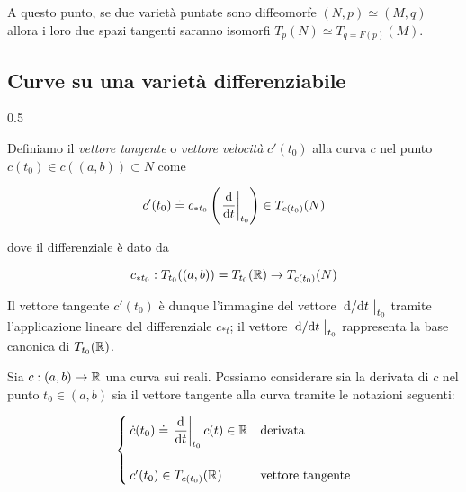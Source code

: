 A questo punto, se due varietà puntate sono diffeomorfe $ (N,p) \simeq (M,q) $ allora i loro due spazi tangenti saranno isomorfi $ T_{p}(N) \simeq T_{q=F(p)}(M) $.

\subsection{Curve su una varietà differenziabile}

	{0.5}{%
			}

Definiamo il \textit{vettore tangente} o \textit{vettore velocità} $ c'(t_{0}) $ alla curva $ c $ nel punto $ c(t_{0}) \in c((a,b)) \subset N $ come

\begin{equation}
	c'(t_{0}) \doteq c_{*t_{0}} \left( \eval{ \dv{t} }_{t_{0}} \right) \in T_{c(t_{0})}(N)
\end{equation}

dove il differenziale è dato da

\begin{equation}
	c_{*t_{0}} : T_{t_{0}}((a,b)) = T_{t_{0}}(\mathbb{R}) \to T_{c(t_{0})}(N)
\end{equation}

Il vettore tangente $ c'(t_{0}) $ è dunque l'immagine del vettore $ \eval{ \dv*{t} }_{t_{0}} $ tramite l'applicazione lineare del differenziale $ c_{*t} $; il vettore $ \eval{ \dv*{t} }_{t_{0}} $ rappresenta la base canonica di $ T_{t_{0}}(\mathbb{R}) $.

\begin{remark}
	Sia $ c : (a,b) \to \mathbb{R} $ una curva sui reali. Possiamo considerare sia la derivata di $ c $ nel punto $ t_{0} \in (a,b) $ sia il vettore tangente alla curva tramite le notazioni seguenti:
	
	\begin{equation}
		\begin{cases}
			\dot{c}(t_{0}) \doteq \eval{ \ddv{t} }_{t_{0}} c(t) \in \R & \text{derivata} \\\\
			c'(t_{0}) \in T_{c(t_{0})}(\R) & \text{vettore tangente}
		\end{cases}
	\end{equation}
\end{remark}

